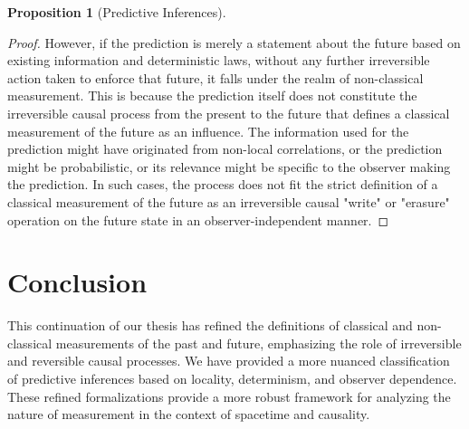 \documentclass{article}
\theoremstyle{definition}
\newtheorem{proposition}[definition]{Proposition}
\begin{document}
\begin{proposition}[Predictive Inferences]
\begin{proof}
			However, if the prediction is merely a statement about the future based on existing information and deterministic laws, without any further irreversible action taken to enforce that future, it falls under the realm of non-classical measurement. This is because the prediction itself does not constitute the irreversible causal process from the present to the future that defines a classical measurement of the future as an influence. The information used for the prediction might have originated from non-local correlations, or the prediction might be probabilistic, or its relevance might be specific to the observer making the prediction. In such cases, the process does not fit the strict definition of a classical measurement of the future as an irreversible causal "write" or "erasure" operation on the future state in an observer-independent manner.
		\end{proof}
	\end{proposition}
	
	\section{Conclusion}
	
	This continuation of our thesis has refined the definitions of classical and non-classical measurements of the past and future, emphasizing the role of irreversible and reversible causal processes. We have provided a more nuanced classification of predictive inferences based on locality, determinism, and observer dependence. These refined formalizations provide a more robust framework for analyzing the nature of measurement in the context of spacetime and causality.
	
\end{document}
